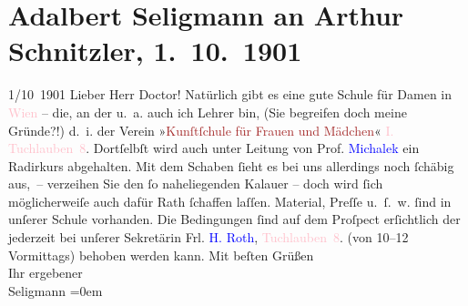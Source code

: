 

               \section[Adalbert Seligmann an Arthur Schnitzler, 1. 10. 1901]{ Adalbert Seligmann an Arthur Schnitzler, 1. 10. 1901}\nopagebreak{}\rehead{ }\normalsize\beginnumbering{} \toendnotes[C]{\smallbreak\pagebreak[2]} 
\pstart
           \raggedleft{}{\pb}1/10 1901\pend
           \pstart
           Lieber Herr Doctor! Natürlich gibt es eine gute Schule für
                    Damen in \textcolor{pink}{Wien}{}\ledrightnote{\textcolor{pink}{Wien}} – die, an der u. a. auch ich
                    Lehrer bin, (Sie begreifen doch meine Gründe?!) d. i. der Verein »\textcolor{brown}{Kunſtſchule für Frauen und Mädchen}{}\ledrightnote{\textcolor{brown}{Wiener Frauenakademie}}« \textcolor{pink}{I. Tuchlauben 8}{}\ledrightnote{\textcolor{pink}{Tuchlauben}}. Dortſelbſt wird auch unter Leitung von
                    Prof. \textcolor{blue}{Michalek}{}\ledrightnote{\textcolor{blue}{Ludwig Michalek}} ein Radirkurs abgehalten. Mit
                    dem Schaben ſieht es bei uns allerdings noch ſchäbig aus, – verzeihen Sie den ſo
                        {\pb}naheliegenden Kalauer – doch
                    wird ſich möglicherweiſe auch dafür Rath ſchaffen laſſen. Material, Preſſe
                    u. ſ. w. ſind in unſerer Schule vorhanden. Die Bedingungen ſind auf dem Proſpect
                    erſichtlich der jederzeit bei unſerer Sekretärin Frl. \textcolor{blue}{H. Roth}{}\ledrightnote{\textcolor{blue}{H. Roth}}, \textcolor{pink}{Tuchlauben 8}{}\ledrightnote{\textcolor{pink}{Tuchlauben}}.
                    (von 10–12 Vormittags) behoben werden kann.\pend
           \pstart
           Mit beſten Grüßen{\\[\baselineskip]}Ihr ergebener{\\[\baselineskip]}\spacefill\mbox{Seligmann}\pend
           \leftskip=0em{}\endnumbering{}  
      